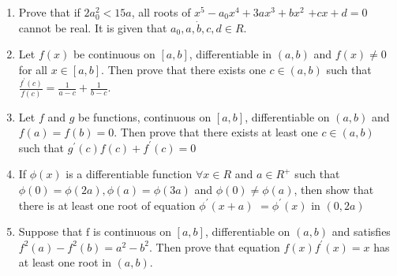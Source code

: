 \begin{enumerate}
    \item Prove that if $2 a_0^2<15 a$, all roots of $x^5-a_0 x^4+3 a x^3+b x^2$ $+c x+d=0$ cannot be real. It is given that $a_0, a, \dot{b}, c, d \in R$.
\item Let $f(x)$ be continuous on $[a, b]$, differentiable in $(a, b)$ and $f(x) \neq 0$ for all $x \in[a, b]$. Then prove that there exists one $c \in(a, b)$ such that $\frac{f^{\prime}(c)}{f(c)}=\frac{1}{a-c}+\frac{1}{b-c}$.

\item  Let $f$ and $g$ be functions, continuous on $[a, b]$, differentiable on $(a, b)$ and $f(a)=f(b)=0$. Then prove that there exists at least one $c \in(a, b)$ such that $g^{\prime}(c) f(c)+f^{\prime}(c)=0$
\item  If $\phi(x)$ is a differentiable function $\forall x \in R$ and $a \in R^{+}$ such that $\phi(0)=\phi(2 a), \phi(a)=\phi(3 a)$ and $\phi(0) \neq \phi(a)$, then show that there is at least one root of equation $\phi^{\prime}(x+a)$ $=\phi^{\prime}(x)$ in $(0,2 a)$
\item  Suppose that $\mathrm{f}$ is continuous on $[a, b]$, differentiable on $(a, b)$ and satisfies $f^2(a)-f^2(b)=a^2-b^2$. Then prove that equation $f(x) f^{\prime}(x)=x$ has at least one root in $(a, b)$.
\end{enumerate}
